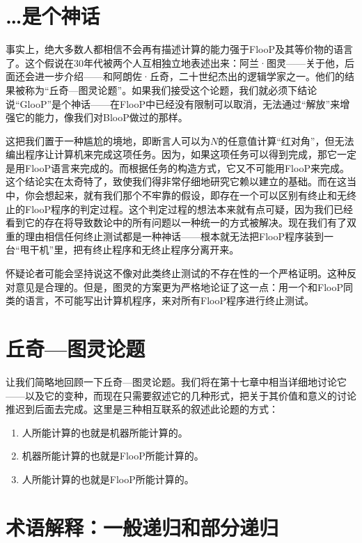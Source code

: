 \section{…是个神话}

事实上，绝大多数人都相信不会再有描述计算的能力强于FlooP及其等价物的语言了。这个假说在30年代被两个人互相独立地表述出来：阿兰·图灵——关于他，后面还会进一步介绍——和阿朗佐·丘奇，二十世纪杰出的逻辑学家之一。他们的结果被称为“丘奇—图灵论题”。如果我们接受这个论题，我们就必须下结论说“GlooP”是个神话——在FlooP中已经没有限制可以取消，无法通过“解放”来增强它的能力，像我们对BlooP做过的那样。

这把我们置于一种尴尬的境地，即断言人可以为$N$的任意值计算“红对角”，但无法编出程序让计算机来完成这项任务。因为，如果这项任务可以得到完成，那它一定是用FlooP语言来完成的。而根据任务的构造方式，它又不可能用FlooP来完成。这个结论实在太奇特了，致使我们得非常仔细地研究它赖以建立的基础。而在这当中，你会想起来，就有我们那个不牢靠的假设，即存在一个可以区别有终止和无终止的FlooP程序的判定过程。这个判定过程的想法本来就有点可疑，因为我们已经看到它的存在将导致数论中的所有问题以一种统一的方式被解决。现在我们有了双重的理由相信任何终止测试都是一种神话——根本就无法把FlooP程序装到一台“甩干机”里，把有终止程序和无终止程序分离开来。

怀疑论者可能会坚持说这不像对此类终止测试的不存在性的一个严格证明。这种反对意见是合理的。但是，图灵的方案更为严格地论证了这一点：用一个和FlooP同类的语言，不可能写出计算机程序，来对所有FlooP程序进行终止测试。

\section{丘奇—图灵论题}

让我们简略地回顾一下丘奇—图灵论题。我们将在第十七章中相当详细地讨论它——以及它的变种，而现在只需要叙述它的几种形式，把关于其价值和意义的讨论推迟到后面去完成。这里是三种相互联系的叙述此论题的方式：
\begin{enumerate}
\item 人所能计算的也就是机器所能计算的。
\item 机器所能计算的也就是FlooP所能计算的。
\item 人所能计算的也就是FlooP所能计算的。
\end{enumerate}

\section{术语解释：一般递归和部分递归}


